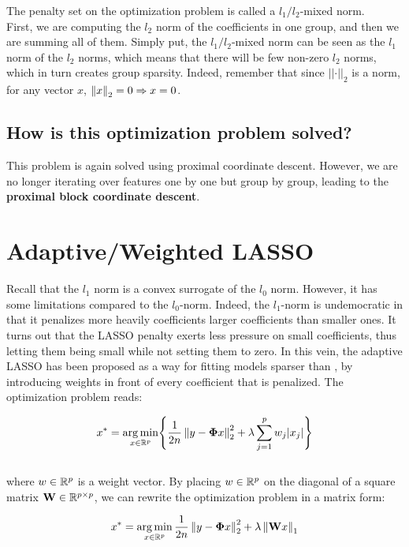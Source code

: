 \documentclass[a4paper,10pt]{article}
\theoremstyle{definition}
\begin{document}
The penalty set on the optimization problem is called a $l_1/l_2$-mixed norm.
\\

First, we are computing the $l_2$ norm of the coefficients in one group, and then we are summing all of them. Simply put, the $l_1/l_2$-mixed norm can be seen
as the $l_1$ norm of the $l_2$ norms, which means that there will be few non-zero $l_2$ norms, which in turn creates group sparsity. Indeed, remember that since $\lvert \lvert \cdot \rvert \rvert_2$ is a norm, for any vector $x$,
$\left \lVert  x \right \rVert_2 = 0 \Rightarrow x = 0$.

\subsection*{How is this optimization problem solved?}

This problem is again solved using proximal coordinate descent. However, we are no longer iterating over features one by one but group by group, leading to the \textbf{proximal block coordinate descent}.

\section{Adaptive/Weighted LASSO}
\label{section_3}

Recall that the $l_1$ norm is a convex surrogate of the $l_0$ norm. However, it has some limitations compared to
the $l_0$-norm. Indeed, the $l_1$-norm is undemocratic in that it penalizes more heavily coefficients larger coefficients than smaller ones. It turns out that the LASSO penalty exerts less pressure on small coefficients,
thus letting them being small while not setting them to zero. In this vein, the adaptive LASSO has been proposed as a way for fitting models sparser than , by introducing weights in front of every coefficient that is
penalized. The optimization problem reads:

\begin{equation*}
    x^* = \operatorname*{arg\,min}_{x \in \mathbb{R}^p} \Biggl\{ \frac{1}{2n} \left \lVert  y - \mathbf{\Phi}x \right \rVert_2^2 + \lambda \sum_{j=1}^p w_j \lvert x_j \rvert \Biggr\}
\end{equation*}
\\
where $w \in \mathbb{R}^p$ is a weight vector. By placing $w \in \mathbb{R}^p$ on the diagonal of a square matrix $\mathbf{W} \in \mathbb{R}^{p \times p}$, we can rewrite the optimization problem in a matrix form:

\begin{equation*}
    x^* = \operatorname*{arg\,min}_{x \in \mathbb{R}^p} \frac{1}{2n} \left \lVert y - \mathbf{\Phi}x \right \rVert_2^2 + \lambda \left \lVert \mathbf{W}x \right \rVert_1
\end{equation*}
\end{document}
